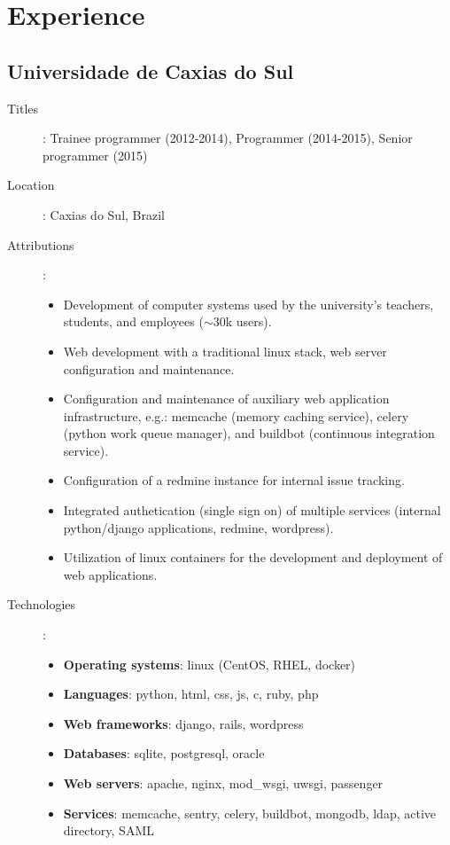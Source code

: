 \section*{Experience}
\subsection*{Universidade de Caxias do Sul}

\begin{description}
    \item[Titles]:
        Trainee programmer (2012-2014), Programmer (2014-2015), Senior
        programmer (2015)
    \item[Location]: Caxias do Sul, Brazil
    \item[Attributions]:
        \begin{itemize}
            \item
                Development of computer systems used by the university's
                teachers, students, and employees ($\sim$30k users).
            \item
                Web development with a traditional linux stack, web server
                configuration and maintenance.
            \item
                Configuration and maintenance of auxiliary web application
                infrastructure, e.g.: memcache (memory caching service), celery
                (python work queue manager), and buildbot (continuous
                integration service).
            \item
                Configuration of a redmine instance for internal issue
                tracking.
            \item
                Integrated authetication (single sign on) of multiple services
                (internal python/django applications, redmine, wordpress).
            \item
                Utilization of linux containers for the development and
                deployment of web applications.
        \end{itemize}
    \item[Technologies]:
        \begin{itemize}
            \item \textbf{Operating systems}: linux (CentOS, RHEL, docker)
            \item \textbf{Languages}: python, html, css, js, c, ruby, php
            \item \textbf{Web frameworks}: django, rails, wordpress
            \item \textbf{Databases}: sqlite, postgresql, oracle
            \item \textbf{Web servers}:
                apache, nginx, mod\_wsgi, uwsgi, passenger
            \item \textbf{Services}:
                memcache, sentry, celery, buildbot, mongodb, ldap, active
                directory, SAML
        \end{itemize}
\end{description}

